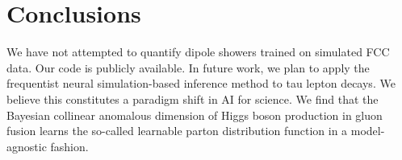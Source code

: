 \section{Conclusions}\label{sec:conclusions}

We have not attempted to quantify dipole showers trained on simulated
FCC data. Our code is publicly available. In future work, we plan to
apply the frequentist neural simulation-based inference method to tau
lepton decays. We believe this constitutes a paradigm shift in AI for
science. We find that the Bayesian collinear anomalous dimension of
Higgs boson production in gluon fusion learns the so-called learnable
parton distribution function in a model-agnostic fashion.

